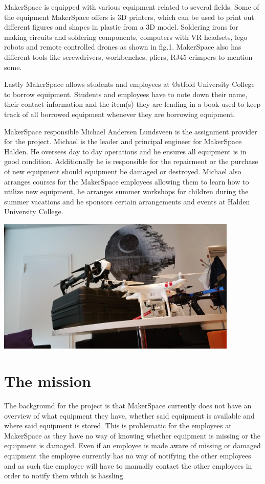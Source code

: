 MakerSpace is equipped with various equipment related to several fields.
Some of the equipment MakerSpace offers is 3D printers, which can be used to print out different figures and shapes in plastic from a 3D model. Soldering irons for making circuits and soldering components, computers with VR headsets, lego robots and remote controlled drones as shown in fig.1\cite{Figure-Drone}. MakerSpace also has different tools like screwdrivers, workbenches, pliers, RJ45 crimpers to mention some.

Lastly MakerSpace allows students and employees at Østfold University College to borrow equipment.
Students and employees have to note down their name, their contact information and the item(s) they are lending in a book used to keep track of all borrowed equipment whenever they are borrowing equipment.

MakerSpace responsible Michael Andersen Lundsveen is the assignment provider for the project. 
Michael is the leader and principal engineer for MakerSpace Halden.
He oversees day to day operations and he ensures all equipment is in good condition.
Additionally he is responsible for the repairment or the purchase of new equipment should equipment be damaged or destroyed.
Michael also arranges courses for the MakerSpace employees allowing them to learn how to utilize new equipment, he arranges summer workshops for children during the summer vacations and he sponsors certain arrangements and events at Halden University College.

\includegraphics[width=115mm,scale=1]{images/makerspace.png}

\section{The mission}
The background for the project is that MakerSpace currently does not have an overview of what equipment they have, whether said equipment is available and where said equipment is stored.
This is problematic for the employees at MakerSpace as they have no way of knowing whether equipment is missing or the equipment is damaged.
Even if an employee is made aware of missing or damaged equipment the employee currently has no way of notifying the other employees and as such the employee will have to manually contact the other employees in order to notify them which is hassling.

